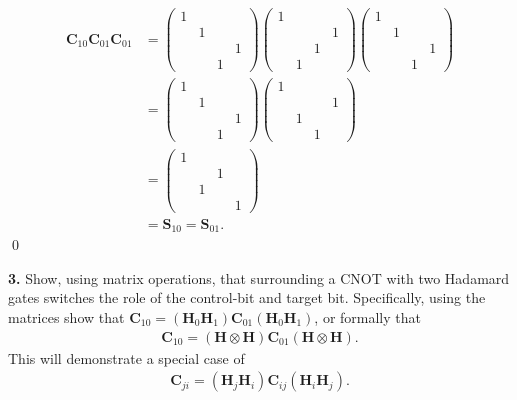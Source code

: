 \documentclass{book}
\theoremstyle{definition}
\newcommand{\nn}{\nonumber}
\newcommand{\had}{\mathbf{H}}
\begin{document}
\begin{align}
\mathbf{C}_{10}\mathbf{C}_{01}\mathbf{C}_{01} &=
\begin{pmatrix}
1&&&\\&1&&\\&&&1\\&&1&
\end{pmatrix} \begin{pmatrix}
1 &&&\\&&&1\\&&1&\\&1&&
\end{pmatrix}
\begin{pmatrix}
1&&&\\&1&&\\&&&1\\&&1&
\end{pmatrix}\nn\\
&= \begin{pmatrix}
1&&&\\&1&&\\&&&1\\&&1&
\end{pmatrix}\begin{pmatrix}
1&&&\\&&&1\\&1&&\\&&1&
\end{pmatrix} \nn\\
&= \begin{pmatrix}
1&&&\\&&1&\\&1&&\\&&&1
\end{pmatrix}\nn\\
&=\mathbf{S}_{10} = \mathbf{S}_{01}.
\end{align}\qed


\newpage




\noindent \textbf{3.} Show, using matrix operations, that surrounding a CNOT with two Hadamard gates switches the role of the control-bit and target bit. Specifically, using the matrices show that $\mathbf{C}_{10} = (\had_0 \had_1)\mathbf{C}_{01}(\had_0\had_1)$, or formally that 
\begin{align}
\mathbf{C}_{10} = (\had \otimes \had) \mathbf{C}_{01} (\had \otimes \had).
\end{align}
This will demonstrate a special case  of 
\begin{align}
\mathbf{C}_{ji} = (\had_j \had_i) \mathbf{C}_{ij} (\had_i \had_j).
\end{align}
\end{document}
